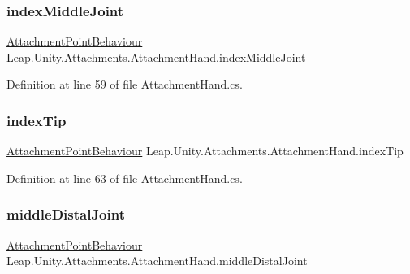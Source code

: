 \subsubsection{\texorpdfstring{indexMiddleJoint}{indexMiddleJoint}}
{\footnotesize\ttfamily \mbox{\hyperlink{class_leap_1_1_unity_1_1_attachments_1_1_attachment_point_behaviour}{Attachment\+Point\+Behaviour}} Leap.\+Unity.\+Attachments.\+Attachment\+Hand.\+index\+Middle\+Joint}



Definition at line 59 of file Attachment\+Hand.\+cs.

\mbox{\label{class_leap_1_1_unity_1_1_attachments_1_1_attachment_hand_a1814dbacc4424119045e984de39b1495}} 
\subsubsection{\texorpdfstring{indexTip}{indexTip}}
{\footnotesize\ttfamily \mbox{\hyperlink{class_leap_1_1_unity_1_1_attachments_1_1_attachment_point_behaviour}{Attachment\+Point\+Behaviour}} Leap.\+Unity.\+Attachments.\+Attachment\+Hand.\+index\+Tip}



Definition at line 63 of file Attachment\+Hand.\+cs.

\mbox{\label{class_leap_1_1_unity_1_1_attachments_1_1_attachment_hand_a320c99d54c83b67fee27ce037f92d471}} 
\subsubsection{\texorpdfstring{middleDistalJoint}{middleDistalJoint}}
{\footnotesize\ttfamily \mbox{\hyperlink{class_leap_1_1_unity_1_1_attachments_1_1_attachment_point_behaviour}{Attachment\+Point\+Behaviour}} Leap.\+Unity.\+Attachments.\+Attachment\+Hand.\+middle\+Distal\+Joint}



